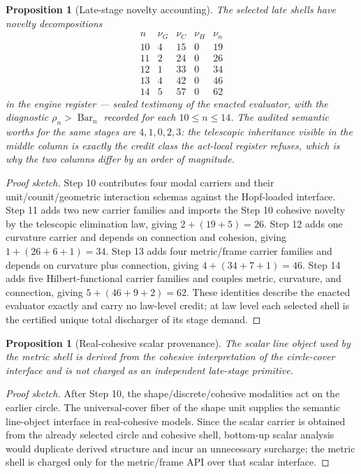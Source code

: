 \documentclass[11pt]{article}
\theoremstyle{plain}
\newtheorem{proposition}[theorem]{Proposition}
\theoremstyle{definition}
\theoremstyle{remark}
\newenvironment{proofsketch}{\begin{proof}[Proof sketch]}{\end{proof}}
\newcommand{\SelBar}{\operatorname{Bar}}
\begin{document}
\begin{proposition}[Late-stage novelty accounting]
The selected late shells have novelty decompositions
\[
\begin{array}{c|c|c|c|c}
n & \nu_G & \nu_C & \nu_H & \nu_n\\
\hline
10&4&15&0&19\\
11&2&24&0&26\\
12&1&33&0&34\\
13&4&42&0&46\\
14&5&57&0&62
\end{array}
\]
in the engine register --- sealed testimony of the enacted evaluator, with the diagnostic \(\rho_n>\SelBar_n\) recorded for each \(10\le n\le14\). The audited semantic worths for the same stages are \(4,1,0,2,3\): the telescopic inheritance visible in the middle column is exactly the credit class the act-local register refuses, which is why the two columns differ by an order of magnitude.
\end{proposition}

\begin{proofsketch}
Step 10 contributes four modal carriers and their unit/counit/geometric interaction schemas against the Hopf-loaded interface. Step 11 adds two new carrier families and imports the Step 10 cohesive novelty by the telescopic elimination law, giving \(2+(19+5)=26\). Step 12 adds one curvature carrier and depends on connection and cohesion, giving \(1+(26+6+1)=34\). Step 13 adds four metric/frame carrier families and depends on curvature plus connection, giving \(4+(34+7+1)=46\). Step 14 adds five Hilbert-functional carrier families and couples metric, curvature, and connection, giving \(5+(46+9+2)=62\). These identities describe the enacted evaluator exactly and carry no law-level credit; at law level each selected shell is the certified unique total discharger of its stage demand.
\end{proofsketch}

\begin{proposition}[Real-cohesive scalar provenance]
The scalar line object used by the metric shell is derived from the cohesive interpretation of the circle-cover interface and is not charged as an independent late-stage primitive.
\end{proposition}

\begin{proofsketch}
After Step 10, the shape/discrete/cohesive modalities act on the earlier circle. The universal-cover fiber of the shape unit supplies the semantic line-object interface in real-cohesive models. Since the scalar carrier is obtained from the already selected circle and cohesive shell, bottom-up scalar analysis would duplicate derived structure and incur an unnecessary surcharge; the metric shell is charged only for the metric/frame API over that scalar interface.
\end{proofsketch}
\end{document}
